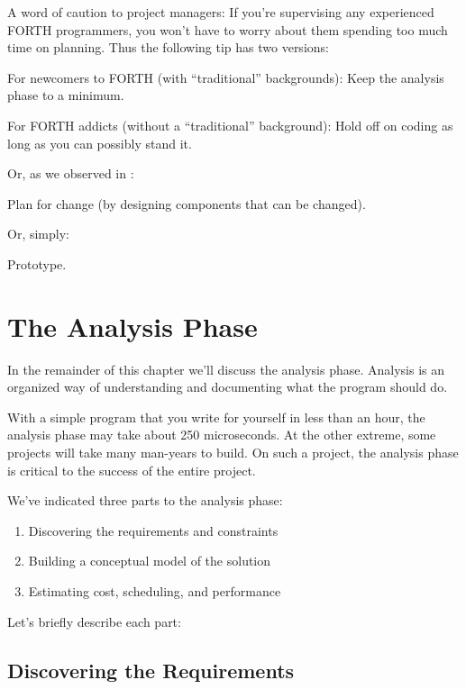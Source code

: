 A word of caution to project managers: If you're supervising any
experienced FORTH programmers, you won't have to worry about them
spending too much time on planning. Thus the following tip has two
versions:

\begin{tip}
For newcomers to FORTH (with ``traditional'' backgrounds):
Keep the analysis phase to a minimum.

For FORTH addicts (without a ``traditional'' background):
Hold off on coding as long as you can possibly stand it.
\end{tip}
Or, as we observed in :

\begin{tip}
Plan for change (by designing components that can be changed).
\end{tip}
Or, simply:

\begin{tip}
Prototype.
\end{tip}

\section{The Analysis Phase}

In the remainder of this chapter we'll discuss the analysis phase.
Analysis is an organized way of understanding and documenting what
the program should do.

With a simple program that you write for yourself in less than an
hour, the analysis phase may take about 250 microseconds. At the other
extreme, some projects will take many man-years to build. On such a
project, the analysis phase is critical to the success of the entire project.

We've indicated three parts to the analysis phase:

\begin{enumerate}	%
\item Discovering the requirements and constraints
\item Building a conceptual model of the solution
\item Estimating cost, scheduling, and performance
\end{enumerate}

\noindent Let's briefly describe each part:

\subsection{Discovering the Requirements}

